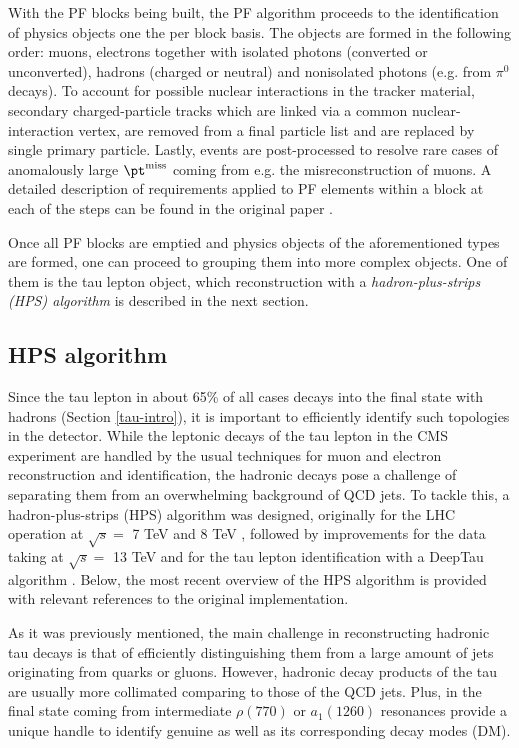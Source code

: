 With the PF blocks being built, the PF algorithm proceeds to the identification of physics objects one the per block basis. The objects are formed in the following order: muons,  electrons together with isolated photons (converted or unconverted), hadrons (charged or neutral) and nonisolated photons (e.g. from $\pi^0$ decays). To account for possible nuclear interactions in the tracker material, secondary charged-particle tracks which are linked via a common nuclear-interaction vertex, are removed from a final particle list and are replaced by single primary particle. Lastly, events are post-processed to resolve rare cases of anomalously large $\pt^{\text{miss}}$ coming from e.g. the misreconstruction of muons. A detailed description of requirements applied to PF elements within a block at each of the steps can be found in the original paper \cite{CMS:2017yfk}.

Once all PF blocks are emptied and physics objects of the aforementioned types are formed, one can proceed to grouping them into more complex objects. One of them is the tau lepton object, which reconstruction with a \textit{hadron-plus-strips (HPS) algorithm} is described in the next section. 

\subsection{HPS algorithm} \label{hps}

Since the tau lepton in about 65\% of all cases decays into the final state with hadrons (Section \ref{tau-intro}), it is important to efficiently identify such topologies in the detector. While the leptonic decays of the tau lepton in the CMS experiment are handled by the usual techniques for muon \cite{CMS:2018rym} and electron \cite{CMS:2020uim} reconstruction and identification, the hadronic decays pose a challenge of separating them from an overwhelming background of QCD jets. To tackle this, a hadron-plus-strips (HPS) algorithm was designed, originally for the LHC operation at $\sqrt{s} = $ 7 TeV \cite{cms2012performance} and 8 TeV \cite{CMS:2015pac}, followed by improvements for the data taking at $\sqrt{s} = $ 13 TeV \cite{CMS:2018jrd} and for the tau lepton identification with a DeepTau algorithm \cite{CMS:2022prd}. Below, the most recent overview of the HPS algorithm is provided with relevant references to the original implementation.

As it was previously mentioned, the main challenge in reconstructing hadronic tau decays is that of efficiently distinguishing them from a large amount of jets originating from quarks or gluons. However, hadronic decay products of the tau are usually more collimated comparing to those of the QCD jets. Plus, \piz in the final state coming from intermediate $\rho(770)$ or $a_1(1260)$ resonances provide a unique handle to identify genuine \tauh as well as its corresponding decay modes (DM).

